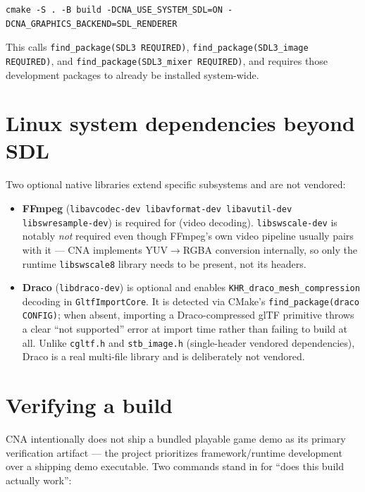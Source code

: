 \begin{lstlisting}[style=cnashell]
cmake -S . -B build -DCNA_USE_SYSTEM_SDL=ON -DCNA_GRAPHICS_BACKEND=SDL_RENDERER
\end{lstlisting}

This calls \texttt{find\_package(SDL3 REQUIRED)},
\texttt{find\_package(SDL3\allowbreak{}\_image REQUIRED)}, and
\texttt{find\_package(SDL3\allowbreak{}\_mixer REQUIRED)}, and requires those development
packages to already be installed system-wide.

\section{Linux system dependencies beyond SDL}

Two optional native libraries extend specific subsystems and are not vendored:

\begin{itemize}
  \item \textbf{FFmpeg} (\texttt{libavcodec-dev libavformat-dev libavutil-dev
        libswresample-dev}) is required for  (video decoding).
        \texttt{libswscale-dev} is notably \emph{not} required even though FFmpeg's own video
        pipeline usually pairs with it --- CNA implements YUV$\to$RGBA conversion internally,
        so only the runtime \texttt{libswscale8} library needs to be present, not its headers.
  \item \textbf{Draco} (\texttt{libdraco-dev}) is optional and enables
        \texttt{KHR\_draco\_mesh\_compression} decoding in \texttt{GltfImportCore}. It is
        detected via CMake's \texttt{find\_package(draco CONFIG)}; when absent, importing a
        Draco-compressed glTF primitive throws a clear ``not supported'' error at import time
        rather than failing to build at all. Unlike \texttt{cgltf.h} and \texttt{stb\_image.h}
        (single-header vendored dependencies), Draco is a real multi-file library and is
        deliberately not vendored.
\end{itemize}

\section{Verifying a build}

CNA intentionally does not ship a bundled playable game demo as its primary verification
artifact --- the project prioritizes framework/runtime development over a shipping demo
executable. Two commands stand in for ``does this build actually work'':

